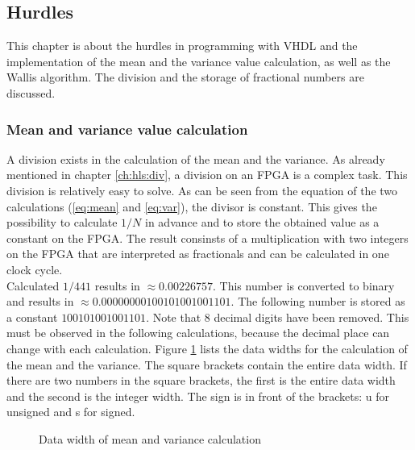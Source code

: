 \subsection{Hurdles} \label{ch:ip:hurdles_vhdl}
This chapter is about the hurdles in programming with VHDL and the
implementation of the mean and the variance value calculation, as well as the
Wallis algorithm.
The division and the storage of fractional numbers are discussed.

\subsubsection*{Mean and variance value calculation}
A division exists in the calculation of the mean and the variance. As already mentioned in chapter \ref{ch:hls:div}, a division on an FPGA is a complex task.
This division is relatively easy to solve. As can be seen from the equation of
the two calculations (\ref{eq:mean} and \ref{eq:var}), the divisor is constant.
This gives the possibility to calculate $1/N$ in advance and to store the
obtained value as a constant on the FPGA. The result consinsts of a multiplication with
two integers on the FPGA that are interpreted as fractionals and can be
calculated in one clock cycle. \\
Calculated $1/441$ results in $\approx 0.00226757$. This number is converted to
binary and results in $\approx 0.00000000100101001001101$. The following number
is stored as a constant $100101001001101$. Note that 8 decimal digits have been
removed. This must be observed in the following calculations, because the
decimal place can change with each calculation. Figure \ref{fig:data_mean_var}
lists the data widths for the calculation of the mean and the variance. The
square brackets contain the entire data width. If there are two numbers in the
square brackets, the first is the entire data width and the second is the
integer width. The sign is in front of the brackets: u for unsigned and s for
signed.

\begin{figure}[tb!]
    \centering
    \begin{adjustbox}{max width=\textwidth, keepaspectratio}
        
    \end{adjustbox}
    \caption{Data width of mean and variance calculation}
    \label{fig:data_mean_var}
\end{figure}

